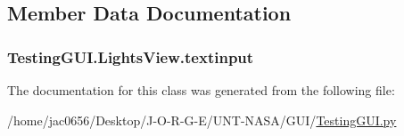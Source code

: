 \subsection{Member Data Documentation}
\subsubsection[{\texorpdfstring{textinput}{textinput}}]{\setlength{\rightskip}{0pt plus 5cm}Testing\+G\+U\+I.\+Lights\+View.\+textinput}\hypertarget{classTestingGUI_1_1LightsView_aa809676a8370b352332b15861fac843e}{}\label{classTestingGUI_1_1LightsView_aa809676a8370b352332b15861fac843e}


The documentation for this class was generated from the following file\+:\begin{DoxyCompactItemize}
\item 
/home/jac0656/\+Desktop/\+J-\/\+O-\/\+R-\/\+G-\/\+E/\+U\+N\+T-\/\+N\+A\+S\+A/\+G\+U\+I/\hyperlink{GUI_2TestingGUI_8py}{Testing\+G\+U\+I.\+py}\end{DoxyCompactItemize}
